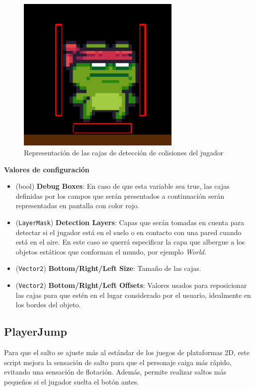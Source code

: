 \begin{figure}[t]
	\centering
	\includegraphics[width = 0.7\textwidth]{Imagenes/CollDetector.png}
	\caption{Representación de las cajas de detección de colisiones del jugador}
	\label{fig:Player_Coll_Detector}
\end{figure}

\textbf{Valores de configuración}
\begin{itemize}
	\item (bool) \textbf{ Debug Boxes}: En caso de que esta variable sea true, las cajas definidas por los campos que serán presentados a continuación serán representadas en pantalla con color rojo.
	\item (\texttt{LayerMask})  \textbf{Detection Layers}: Capas que serán tomadas en cuenta para detectar si el jugador está en el suelo o en contacto con una pared cuando está en el aire. En este caso se querrá especificar la capa que albergue a los objetos estáticos que conforman el mundo, por ejemplo \textit{World}.
	\item (\texttt{Vector2}) \textbf{Bottom/Right/Left Size}: Tamaño de las cajas.
	\item (\texttt{Vector2}) \textbf{Bottom/Right/Left Offsets}: Valores usados para reposicionar las cajas para que estén en el lugar considerado por el usuario, idealmente en los bordes del objeto.
\end{itemize}

\subsection{PlayerJump}

Para que el salto se ajuste más al estándar de los juegos de plataformas 2D, este script mejora la sensación de salto para que el personaje caiga más rápido, evitando una sensación de flotación. Además, permite realizar saltos más pequeños si el jugador suelta el botón antes.\\

